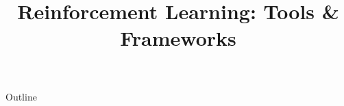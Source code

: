 \documentclass[xcolor=dvipsnames,compress,t,pdf,9pt]{beamer}
\title[\insertframenumber /\inserttotalframenumber]{Reinforcement Learning: Tools \& Frameworks}
\begin{document}
	\begin{frame}
	\titlepage
	\end{frame}

	\begin{frame}{Outline}
	    \tableofcontents
	\end{frame}

	
	
	
\end{document}
